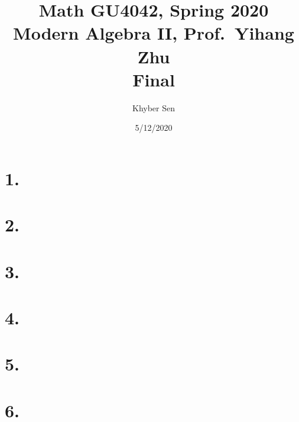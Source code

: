 \documentclass[fleqn]{article}
\title{
Math GU4042, Spring 2020 \\
Modern Algebra II, Prof.\ Yihang Zhu \\
Final
}
\author{Khyber Sen}
\date{5/12/2020}
\begin{document}
    \section{1.}
    
    
    
    \pagebreak
    
    \section{2.}
    
    
    
    \pagebreak
    
    \section{3.}
    
    
    
    \pagebreak
    
    \section{4.}
    
    
    
    \pagebreak
    
    \section{5.}
    
    
    
    \pagebreak
    
    \section{6.}
    
    
    
\end{document}
